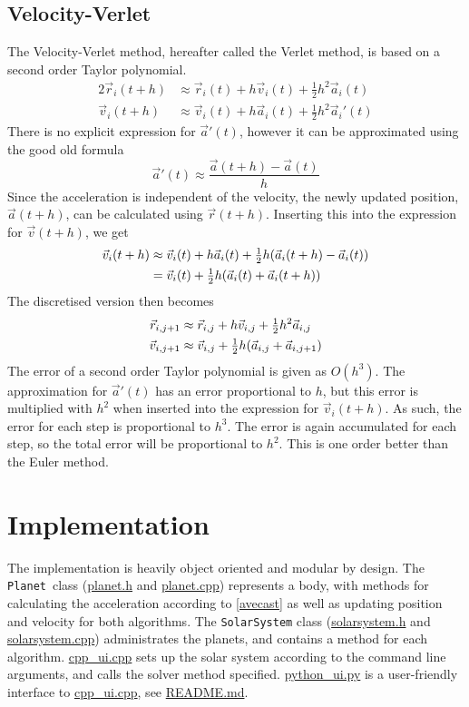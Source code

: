 \documentclass[12pt,english,a4paper]{report}
\newcommand{\program}[1]{\href{https://github.com/anjohan/Offentlig/blob/master/FYS3150/Oblig3/#1}{#1}}
\begin{document}
\subsection{Velocity-Verlet}
The Velocity-Verlet method, hereafter called the Verlet method, is based on a second order Taylor polynomial.
\begin{alignat*}{2}
\vec{r}_i(t+h) &\approx \vec{r}_i(t) + h\vec{v}_i(t) + \tfrac{1}{2}h^2\vec{a}_i(t)\\
\vec{v}_i(t+h) &\approx \vec{v}_i(t) + h\vec{a}_i(t) + \tfrac{1}{2}h^2\vec{a}_i'(t)
\end{alignat*}
There is no explicit expression for \(\vec{a}'(t)\), however it can be approximated using the good old formula
\[
\vec{a}'(t)\approx\frac{\vec{a}(t+h)-\vec{a}(t)}{h}
\]
Since the acceleration is independent of the velocity, the newly updated position, \(\vec{a}(t+h)\), can be calculated using \(\vec{r}(t+h)\). Inserting this into the expression for \(\vec{v}(t+h)\), we get
\begin{alignat*}{2}
\vec{v}_i(t+h) &\approx \vec{v}_i(t) + h\vec{a}_i(t) + \tfrac{1}{2}h\qty(\vec{a}_i(t+h)-\vec{a}_i(t))\\
&= \vec{v}_i(t) + \tfrac{1}{2}h\qty(\vec{a}_i(t)+\vec{a}_i(t+h))
\end{alignat*}
The discretised version then becomes
\begin{alignat*}{2}
\vec{r}_{i,j+1} &\approx \vec{r}_{i,j} + h\vec{v}_{i,j} + \tfrac{1}{2}h^2\vec{a}_{i,j}\\
\vec{v}_{i,j+1} &\approx \vec{v}_{i,j} + \tfrac{1}{2}h\qty(\vec{a}_{i,j} + \vec{a}_{i,j+1})
\end{alignat*}
The error of a second order Taylor polynomial is given as \(O(h^3)\). The approximation for \(\vec{a}'(t)\) has an error proportional to \(h\), but this error is multiplied with \(h^2\) when inserted into the expression for \(\vec{v}_i(t+h)\). As such, the error for each step is proportional to \(h^3\). The error is again accumulated for each step, so the total error will be proportional to \(h^2\). This is one order better than the Euler method.


\section{Implementation}
The implementation is heavily object oriented and modular by design. The \texttt{Planet} class (\program{planet.h} and \program{planet.cpp}) represents a body, with methods for calculating the acceleration according to \ref{avecast} as well as updating position and velocity for both algorithms. The \texttt{SolarSystem} class (\program{solarsystem.h} and \program{solarsystem.cpp}) administrates the planets, and contains a method for each algorithm. \program{cpp\_ui.cpp} sets up the solar system according to the command line arguments, and calls the solver method specified. \program{python\_ui.py} is a user-friendly interface to \program{cpp\_ui.cpp}, see \program{README.md}.
\end{document}
